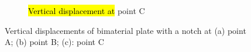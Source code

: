     \begin{figure}[htb]\ContinuedFloat
        \begin{subfigure}[b]{1\linewidth}
            \centering
            \caption{\hl{Vertical displacement at} point C}
        \end{subfigure}
    \caption[Vertical displacements of bimaterial plate with a notch]{Vertical displacements of bimaterial plate with a notch at (a) point A; (b) point B; (c): point C}
    \label{iso_fig:bimaterial_plate_uy}
    \end{figure}

